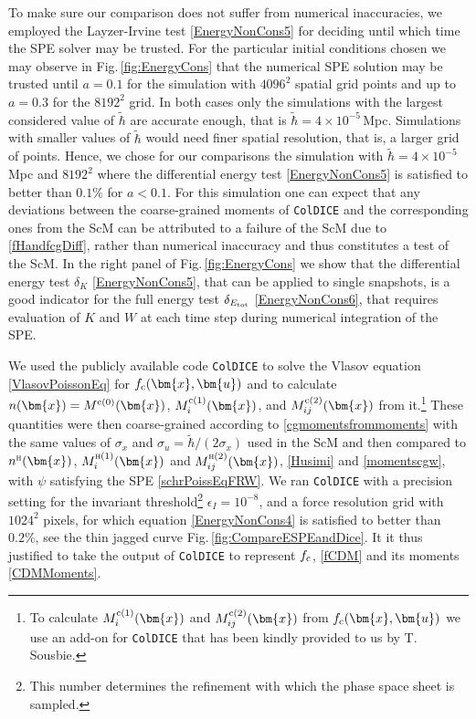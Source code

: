 \documentclass[twocolumn, nofootinbib, showpacs, superscriptaddress]{revtex4-1}
\renewcommand{\H}[0]{{\textsc{h}}}
\newcommand{\sigu}{{\sigma_{\! u}}}
\newcommand{\sigx}{{\sigma_{\! x}}}
\newcommand{\thbar}{\tilde\hbar}
\renewcommand{\c}[0]{{\rm{c}}}
\newcommand{\vx}[0]{\bm{x} }
\newcommand{\vu}[0]{\bm{u} }
\begin{document}
To make sure our comparison does not suffer from  numerical inaccuracies, we employed the Layzer-Irvine test \eqref{EnergyNonCons5}  
for deciding until which time the SPE solver may be trusted.  
For the particular initial conditions chosen we may observe in Fig.\,\ref{fig:EnergyCons} that the numerical SPE solution 
may be trusted until $a=0.1$ for the simulation with $4096^2$ spatial grid points and up to $a=0.3$ for the $8192^2$ grid. 
In both cases only the simulations with the largest considered value of $\thbar$  are accurate enough, that is $\thbar = 4\times 10^{-5}\,$Mpc.
Simulations with smaller values of $\thbar$ would need finer spatial resolution, that is, a larger grid of points.
Hence, we chose for our comparisons the simulation with $\thbar = 4\times 10^{-5}\,$Mpc and $8192^2$ where the differential energy 
test \eqref{EnergyNonCons5} is satisfied to better than $0.1\%$ for $a<0.1$. For this simulation one can expect that any deviations
 between the coarse-grained moments of \texttt{ColDICE}  and the corresponding ones from the ScM 
can be attributed to a failure of the ScM due to \eqref{fHandfcgDiff}, rather than numerical inaccuracy and thus  constitutes 
a test of the ScM.
In the right panel of Fig.\,\ref{fig:EnergyCons} we show that the differential energy test $\delta_K$ \eqref{EnergyNonCons5}, that can be applied to single snapshots, is a good indicator for the full energy test $\delta_{E_{\rm tot}}$ \eqref{EnergyNonCons6}, that requires evaluation of $K$ and $W$ at each time step during numerical integration of the SPE.

We used the publicly available code \texttt{ColDICE} to solve the Vlasov equation \eqref{VlasovPoissonEq} for $f_\c(\vx,\vu)$ and to calculate $n(\vx)  = M^{\c(0)}(\vx) $, $M^{\c(1)}_i(\vx)$, and $M^{\c(2)}_{ij}(\vx)$ from it.\footnote{To calculate $M^{\c(1)}_i(\vx)$ and $M^{\c(2)}_{ij}(\vx)$ from $f_\c(\vx,\vu)$ we use an add-on for \texttt{ColDICE} that has been kindly provided to us by T.\,Sousbie.}
These quantities were then coarse-grained according to \eqref{cgmomentsfrommoments} with the same values of $\sigx$ and $\sigu=\thbar/(2\sigx)$ used in the ScM and then compared to $n^\H(\vx)$, $M^{\H (1)}_{i}(\vx)$ and $M^{\H (2)}_{ij}(\vx)$, \eqref{Husimi} and \eqref{momentscgw}, with  $\psi$ satisfying the SPE  \eqref{schrPoissEqFRW}.
We ran \texttt{ColDICE} with a precision setting for the invariant threshold\footnote{This number determines the refinement with which the phase space sheet is sampled.} $\epsilon_I = 10^{-8}$, and a force resolution grid with $1024^2$ pixels, for which equation \eqref{EnergyNonCons4} is satisfied to better than $0.2\%$, see the thin jagged curve Fig.\,\ref{fig:CompareESPEandDice}.
It it thus justified to take the output of \texttt{ColDICE} to represent $f_\c$, \eqref{fCDM} and its moments \eqref{CDMMoments}.
\end{document}
